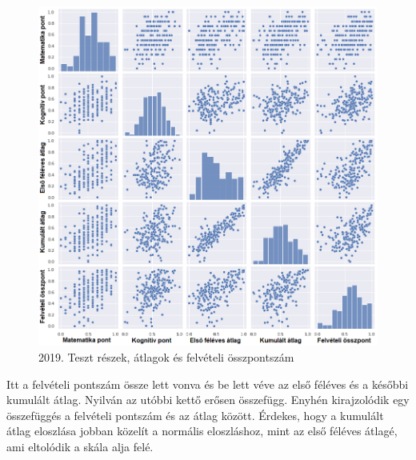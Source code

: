 \documentclass[12pt]{article}
\begin{document}
\begin{figure}[H]
\centering
\includegraphics[width=\textwidth]{kepek/2019minmax4.png}
\caption{2019. Teszt részek, átlagok és felvételi összpontszám}
\label{fig:2019minmax4}
\end{figure}

Itt a felvételi pontszám össze lett vonva és be lett véve az első féléves és a későbbi kumulált átlag. Nyilván az utóbbi kettő erősen összefügg. Enyhén kirajzolódik egy összefüggés a felvételi pontszám és az átlag között. Érdekes, hogy a kumulált átlag eloszlása jobban közelít a normális eloszláshoz, mint az első féléves átlagé, ami eltolódik a skála alja felé.
\end{document}

